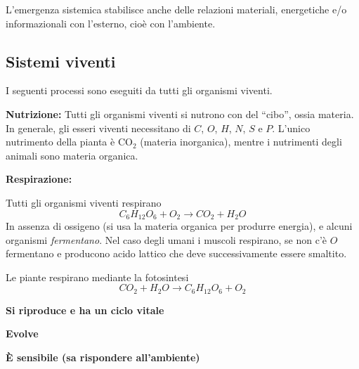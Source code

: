 \documentclass[a4paper]{article}
\newcommand{\quotes}[1]{``#1''}
\begin{document}

L'emergenza sistemica stabilisce anche delle relazioni materiali, energetiche e/o informazionali con l'esterno, cioè con l'ambiente.


\subsection{Sistemi viventi}


I seguenti processi sono eseguiti da tutti gli organismi viventi.

\textbf{Nutrizione:}
Tutti gli organismi viventi si nutrono con del \quotes{cibo}, ossia materia.
In generale, gli esseri viventi necessitano di \(C\), \(O\), \(H\), \(N\), \(S\) e \(P\).
L'unico nutrimento della pianta è CO\({}_2\) (materia inorganica), mentre
i nutrimenti degli animali sono materia organica.



\textbf{Respirazione:}

Tutti gli organismi viventi respirano
\[
    C_6H_{12}O_6 + O_2 \rightarrow CO_2 + H_2O
\]
In assenza di ossigeno (si usa la materia organica per produrre energia), e alcuni organismi \textit{fermentano}.
Nel caso degli umani i muscoli respirano, se non c'è \(O\) fermentano e producono acido lattico
che deve successivamente essere smaltito.

Le piante respirano mediante la fotosintesi
\[
    CO_2 + H_2O \rightarrow C_6H_{12}O_6 + O_2
\]

\textbf{Si riproduce e ha un ciclo vitale}

\textbf{Evolve}

\textbf{È sensibile (sa rispondere all'ambiente)}
\end{document}

